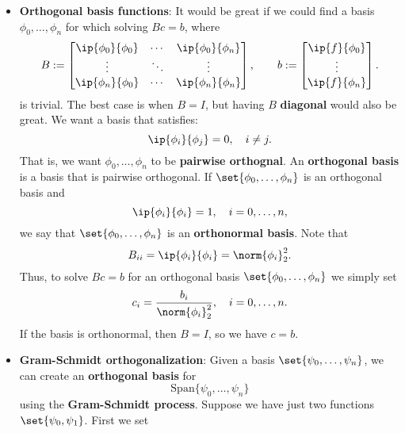 \documentclass{report}
\begin{document}
\begin{itemize}
        \item \textbf{Orthogonal basis functions}:
            It would be great if we could find a basis $\phi_0,\ldots,\phi_n$ for which solving $Bc = b$, where 
            $$
            B := 
            \begin{bmatrix}
                \ip{\phi_0}{\phi_0} & \cdots & \ip{\phi_0}{\phi_n} \\
                \vdots & \ddots & \vdots\\
                \ip{\phi_n}{\phi_0} & \cdots & \ip{\phi_n}{\phi_n} \\
            \end{bmatrix},
            \qquad
            b := 
            \begin{bmatrix}
                \ip{f}{\phi_0}\\
                \vdots\\
                \ip{f}{\phi_n}\\
            \end{bmatrix}.
            $$
            is trivial.
            \bigbreak \noindent 
            The best case is when $B = I$, but having $B$ \textbf{diagonal} would also be great.
            \bigbreak \noindent 
            We want a basis that satisfies:
            $$\ip{\phi_i}{\phi_j} = 0, \quad i \neq j.$$
            That is, we want $\phi_0,\ldots,\phi_n$ to be \textbf{pairwise orthognal}.
            \bigbreak \noindent 
            An \textbf{orthogonal basis} is a basis that is pairwise orthogonal.
            \bigbreak \noindent 
            If $\set{\phi_0,\ldots,\phi_n}$ is an orthogonal basis and
            $$\ip{\phi_i}{\phi_i} = 1, \quad i = 0,\ldots,n,$$
            we say that $\set{\phi_0,\ldots,\phi_n}$ is an \textbf{orthonormal basis}.
            \bigbreak \noindent 
            Note that
            $$B_{ii} = \ip{\phi_i}{\phi_i} = \norm{\phi_i}_2^2.$$
            Thus, to solve $Bc = b$ for an orthogonal basis $\set{\phi_0,\ldots,\phi_n}$ we simply set
            $$ c_i = \frac{b_i}{\norm{\phi_i}_2^2}, \quad i=0,\ldots,n.$$
            If the basis is orthonormal, then $B = I$, so we have $c = b$.
        \item \textbf{Gram-Schmidt orthogonalization}:
            Given a basis $\set{\psi_0,\ldots,\psi_n}$, we can create an \textbf{orthogonal basis} for 
            $$\text{Span}\{\psi_0,\ldots,\psi_n\}$$
            using the \textbf{Gram-Schmidt process}.
            \bigbreak \noindent 
            Suppose we have just two functions $\set{\psi_0,\psi_1}$. First we set 

\end{itemize}
\end{document}
